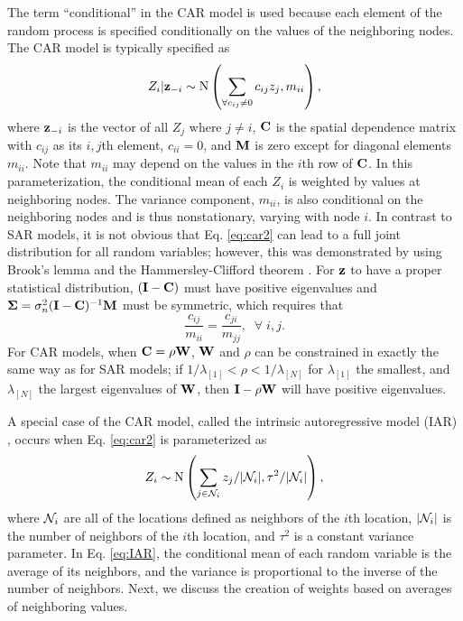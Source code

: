 \documentclass[11pt, titlepage]{article}\usepackage[]{graphicx}\usepackage[]{color}
\begin{document}
\begin{spacing}{1.9}
\begin{flushleft}
The term ``conditional'' in the CAR model is used because each element of the random process is specified conditionally on the values of the neighboring nodes. The CAR model is typically specified as
\begin{equation}
				Z_i|\mathbf{z}_{-i} \sim \textrm{N}\left(\sum_{\forall c_{ij}\neq 0} c_{ij}z_j,m_{ii}\right),
  \label{eq:car2}
\end{equation}
where $\mathbf{z}_{-i}$ is the vector of all $Z_j$ where $j \ne i$, $\mathbf{C}$ is the spatial dependence matrix with $c_{ij}$ as its $i,j$th element, $c_{ii} = 0$, and $\mathbf{M}$ is zero except for diagonal elements $m_{ii}$. Note that $m_{ii}$ may depend on the values in the $i$th row of $\mathbf{C}$. In this parameterization, the conditional mean of each $Z_i$ is weighted by values at neighboring nodes. The variance component, $m_{ii}$, is also conditional on the neighboring nodes and is thus nonstationary, varying with node $i$.  In contrast to SAR models, it is not obvious that Eq. \ref{eq:car2} can lead to a full joint distribution for all random variables; however, this was demonstrated by \citet{Besa:spat:1974} using Brook's lemma \citep{Broo:dist:1964} and the Hammersley-Clifford theorem \citep{Hamm:Clif:Mark:1971,Clif:Mark:1990}. For $\mathbf{z}$ to have a proper statistical distribution, $(\mathbf{I}-\mathbf{C})$ must have positive eigenvalues and $\mbox{\boldmath $\Sigma$} = \sigma^2_n(\mathbf{I}-\mathbf{C})^{-1}\mathbf{M}$ must be symmetric, which requires that
\begin{equation} \label{eq:CarSymmetry}
				\frac{c_{ij}}{m_{ii}}=\frac{c_{ji}}{m_{jj}}, \; \; \forall \; i,j.
\end{equation}
For CAR models, when $\mathbf{C} = \rho\mathbf{W}$, $\mathbf{W}$ and $\rho$ can be constrained in exactly the same way as for SAR models; if $1/\lambda_{[1]} < \rho < 1/\lambda_{[N]}$ for $\lambda_{[1]}$ the smallest, and $\lambda_{[N]}$ the largest eigenvalues of $\mathbf{W}$, then $\mathbf{I} - \rho\mathbf{W}$ will have positive eigenvalues. 

A special case of the CAR model, called the intrinsic autoregressive model (IAR) \citep{Besa:Koop:cond:1995}, occurs when Eq. \ref{eq:car2} is parameterized as
\begin{equation} \label{eq:IAR}
 Z_i \sim \textrm{N}\left(\sum_{j \in \mathcal{N}_i} z_j/|\mathcal{N}_i|,\tau^2/|\mathcal{N}_i|\right),
\end{equation}
where $\mathcal{N}_i$ are all of the locations defined as neighbors of the $i$th location, $|\mathcal{N}_i|$ is the number of neighbors of the $i$th location, and $\tau^2$ is a constant variance parameter.  In Eq. \ref{eq:IAR}, the conditional mean of each random variable is the average of its neighbors, and the variance is proportional to the inverse of the number of neighbors.  Next, we discuss the creation of weights based on averages of neighboring values.


\end{flushleft}
\end{spacing}
\end{document}
